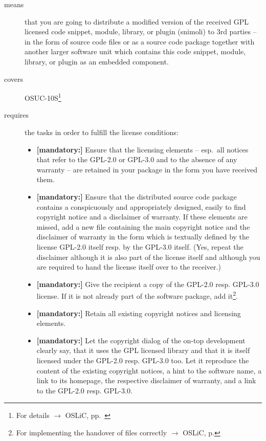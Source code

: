 \begin{description}
\item[means] that you are going to distribute a modified version of the received
GPL licensed code snippet, module, library, or plugin (snimoli) to 3rd parties
-- in the form of source code files or as a source code package together with
another larger software unit which contains this code snippet, module, library,
or plugin as an embedded component.
\item[covers] OSUC-10S\footnote{For details $\rightarrow$ OSLiC, pp.\
\pageref{OSUC-10S-DEF}}
\item[requires] the tasks in order to fulfill the license conditions:
\begin{itemize}


  \item \textbf{[mandatory:]} Ensure that the licensing elements -- esp.\ all
  notices that refer to the GPL-2.0 or GPL-3.0 and to the absence of any
  warranty -- are retained in your package in the form you have received them.

  \item \textbf{[mandatory:]} Ensure that the distributed source code package
  contains a conspicuously and appropriately designed, easily to find copyright
  notice and a disclaimer of warranty. If these elements are missed, add a new
  file containing the main copyright notice and the disclaimer of warranty in
  the form which is textually defined by the license GPL-2.0 itself resp. by the
  GPL-3.0 itself. (Yes, repeat the disclaimer although it is also part of the
  license itself and although you are required to hand the license itself over
  to the receiver.)
  
  \item \textbf{[mandatory:]} Give the recipient a copy of the GPL-2.0 resp.
  GPL-3.0 license. If it is not already part of the software package, add
  it\footnote{For implementing the handover of files correctly $\rightarrow$
  OSLiC, p. \pageref{DistributingFilesHint}}.
  
  \item \textbf{[mandatory:]} Retain all existing copyright notices and
  licensing elements.
  
  \item \textbf{[mandatory:]} Let the copyright dialog of the on-top development
  clearly say, that it uses the GPL licensed library and that it is itself
  licensed under the GPL-2.0 resp. GPL-3.0 too. Let it reproduce the content of
  the existing copyright notices, a hint to the software name, a link to its
  homepage, the respective disclaimer of warranty, and a link to the GPL-2.0
  resp. GPL-3.0.
    

\end{itemize}
\end{description}
